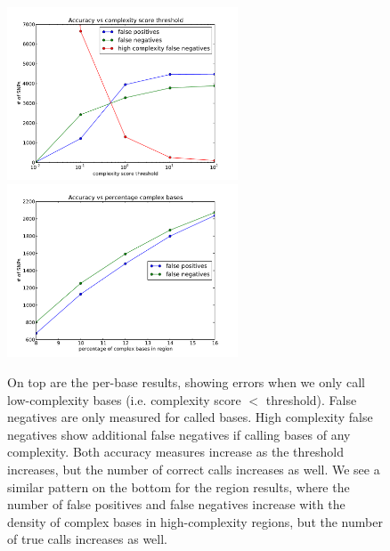 \documentclass[10pt]{article}
\begin{document}
\begin{figure}[h!]
	\includegraphics[width=2.7in]{figs/base_accuracy_vs_thresh.pdf}
	\includegraphics[width=2.7in]{figs/region_accuracy_vs_thresh.pdf}
	\caption{On top are the per-base results, showing errors when we only call low-complexity bases (i.e. complexity score $<$ threshold).
  False negatives are only measured for called bases.
  High complexity false negatives show additional false negatives if calling bases of any complexity.
  Both accuracy measures increase as the threshold increases, but the number of correct calls increases as well.
  We see a similar pattern on the bottom for the region results, where the number of false positives and false negatives increase with the density of complex bases in high-complexity regions, but the number of true calls increases as well.}
\end{figure}
\end{document}
